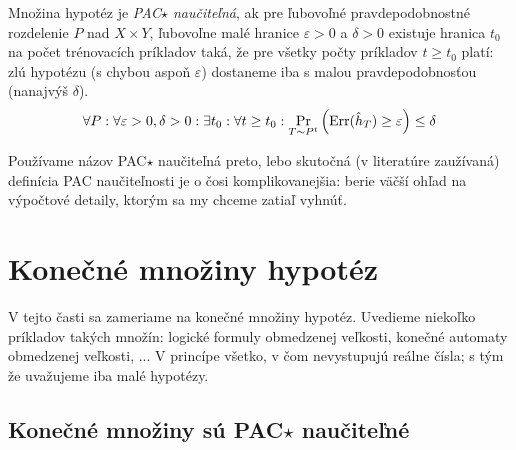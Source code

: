 \begin{definition}
  Množina hypotéz je \emph{PAC$\star$ naučiteľná}, ak pre ľubovoľné pravdepodobnostné
  rozdelenie $P$ nad $X \times Y$, ľubovoľne malé hranice $\varepsilon > 0$ a $\delta > 0$
  existuje hranica $t_0$ na počet trénovacích príkladov taká, že pre všetky
  počty príkladov $t \geq t_0$ platí: zlú hypotézu (s chybou
  aspoň $\varepsilon$) dostaneme iba s malou pravdepodobnosťou
  (nanajvýš $\delta$).
  $$ \forall P: \forall \varepsilon > 0, \delta > 0: \exists t_0: \forall t \geq t_0: \operatorname*{\mathrm{Pr}}_{T \sim P^t} \left( \mathrm{Err}(\hat{h}_T) \geq \varepsilon \right) \leq \delta $$
\end{definition}

Používame názov PAC$\star$ naučiteľná preto, lebo skutočná (v literatúre
zaužívaná) definícia PAC naučiteľnosti je o čosi komplikovanejšia: berie
väčší ohľad na výpočtové detaily, ktorým sa my chceme zatiaľ vyhnúť.





\section{Konečné množiny hypotéz}

V tejto časti sa zameriame na konečné množiny hypotéz. Uvedieme
niekoľko príkladov takých množín: logické formuly obmedzenej
veľkosti, konečné automaty obmedzenej veľkosti, ... V princípe
všetko, v čom nevystupujú reálne čísla; s tým že uvažujeme iba
malé hypotézy.



\subsection{Konečné množiny sú PAC$\star$ naučiteľné}

